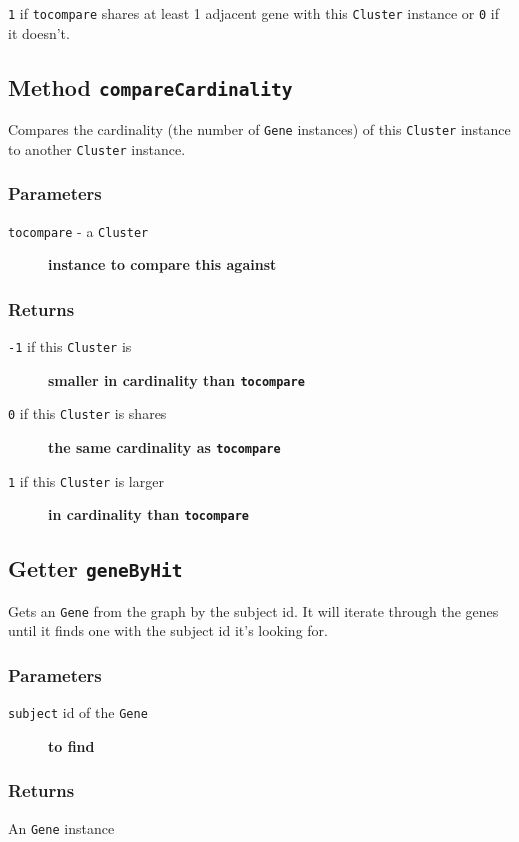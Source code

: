 \texttt{1} if \texttt{tocompare} shares at least 1 adjacent gene with this \texttt{Cluster} instance or
\texttt{0} if it doesn't.

\subsection*{Method \texttt{compareCardinality}\label{Method_compareCardinality}}


Compares the cardinality (the number of \texttt{Gene} instances) of this \texttt{Cluster} instance
to another \texttt{Cluster} instance.

\subsubsection*{Parameters\label{Parameters}}
\begin{description}

\item[{\texttt{tocompare} - a \texttt{Cluster}}] \textbf{instance to compare this against}\end{description}
\subsubsection*{Returns\label{Returns}}
\begin{description}

\item[{\texttt{-1} if this \texttt{Cluster} is}] \textbf{smaller in cardinality than \texttt{tocompare}}
\item[{\texttt{0} if this \texttt{Cluster} is shares}] \textbf{the same cardinality as \texttt{tocompare}}
\item[{\texttt{1} if this \texttt{Cluster} is larger}] \textbf{in cardinality than \texttt{tocompare}}\end{description}
\subsection*{Getter \texttt{geneByHit}\label{Getter_geneByHit}}


Gets an \texttt{Gene} from the graph by the subject id. It will iterate through
the genes until it finds one with the subject id it's looking for.

\subsubsection*{Parameters\label{Parameters}}
\begin{description}

\item[{\texttt{subject} id of the \texttt{Gene}}] \textbf{to find}\end{description}
\subsubsection*{Returns\label{Returns}}


An \texttt{Gene} instance

